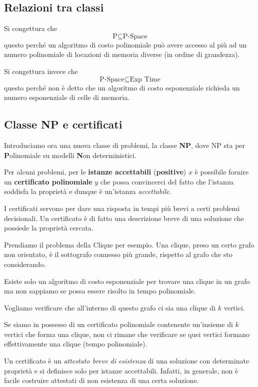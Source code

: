 \subsection{Relazioni tra classi}
Si congettura che
\[ \text{P} \subseteq \text{P-Space} \]
questo perch\'e un algoritmo di costo polinomiale pu\`o avere accesso al pi\`u ad un numero polinomiale di locazioni di
memoria diverse (in ordine di grandezza).

Si congettura invece che
\[ \text{P-Space} \subseteq \text{Exp Time} \]
questo perch\'e non \`e detto che un algoritmo di costo esponenziale richieda un numero esponenziale di celle di memoria.

\subsection{Classe NP e certificati}
Introduciamo ora una nuova classe di problemi, la classe \textbf{NP}, dove NP sta per \textbf{P}olinomiale su modelli
\textbf{N}on deterministici.

Per alcuni problemi, per le \textbf{istanze accettabili} (\textbf{positive}) $x$ \`e possibile fornire un
\textbf{certificato polinomiale} $y$ che possa convincerci del fatto che l'istanza soddisfa la propriet\`a e dunque
\`e un'istanza \emph{accettabile}.

I certificati servono per dare una risposta in tempi pi\`u brevi a certi problemi decisionali. Un certificato \`e di
fatto una descrizione breve di una soluzione che possiede la propriet\`a cercata.

\begin{example}
	Prendiamo il problema della Clique per esempio. Una clique, preso un certo grafo non orientato, \`e il sottografo
	connesso pi\`u grande, rispetto al grafo che sto considerando.

	Esiste solo un algoritmo di costo esponenziale per trovare una clique in un grafo ma non sappiamo se possa essere
	risolto in tempo polinomiale.

	Vogliamo verificare che all'interno di questo grafo ci sia una clique di $k$ vertici.

	Se siamo in possesso di un certificato polinomiale contenente un'insieme di $k$ vertici che forma una clique, non ci
	rimane che verificare se quei vertici formano effettivamente una clique (tempo polinomiale).
\end{example}

Un certificato \`e un \emph{attestato breve di esistenza} di una soluzione con determinate propriet\`a e si definisce solo
per istanze accettabili. Infatti, in generale, non \`e facile costruire attestati di non esistenza di una certa soluzione.

